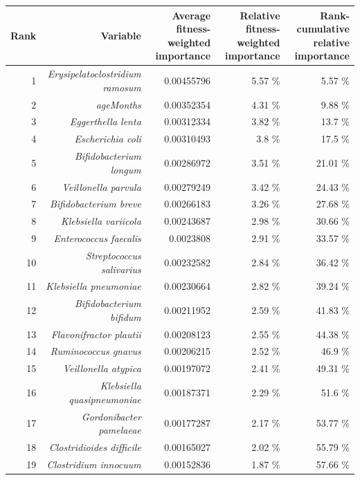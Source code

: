 \documentclass{article}
\begin{document}
\begin{table}
    \begin{tabular}{|r|r|r|r|r|}
      \hline\hline
      \textbf{Rank} & \textbf{Variable} & \textbf{Average fitness-weighted importance} & \textbf{Relative fitness-weighted importance} & \textbf{Rank-cumulative relative importance } \\\hline
      1 & \textit{Erysipelatoclostridium ramosum} & 0.00455796 & 5.57 \% & 5.57 \% \\
      2 & \textit{ageMonths} & 0.00352354 & 4.31 \% & 9.88 \% \\
      3 & \textit{Eggerthella lenta} & 0.00312334 & 3.82 \% & 13.7 \% \\
      4 & \textit{Escherichia coli} & 0.00310493 & 3.8 \% & 17.5 \% \\
      5 & \textit{Bifidobacterium longum} & 0.00286972 & 3.51 \% & 21.01 \% \\
      6 & \textit{Veillonella parvula} & 0.00279249 & 3.42 \% & 24.43 \% \\
      7 & \textit{Bifidobacterium breve} & 0.00266183 & 3.26 \% & 27.68 \% \\
      8 & \textit{Klebsiella variicola} & 0.00243687 & 2.98 \% & 30.66 \% \\
      9 & \textit{Enterococcus faecalis} & 0.0023808 & 2.91 \% & 33.57 \% \\
      10 & \textit{Streptococcus salivarius} & 0.00232582 & 2.84 \% & 36.42 \% \\
      11 & \textit{Klebsiella pneumoniae} & 0.00230664 & 2.82 \% & 39.24 \% \\
      12 & \textit{Bifidobacterium bifidum} & 0.00211952 & 2.59 \% & 41.83 \% \\
      13 & \textit{Flavonifractor plautii} & 0.00208123 & 2.55 \% & 44.38 \% \\
      14 & \textit{Ruminococcus gnavus} & 0.00206215 & 2.52 \% & 46.9 \% \\
      15 & \textit{Veillonella atypica} & 0.00197072 & 2.41 \% & 49.31 \% \\
      16 & \textit{Klebsiella quasipneumoniae} & 0.00187371 & 2.29 \% & 51.6 \% \\
      17 & \textit{Gordonibacter pamelaeae} & 0.00177287 & 2.17 \% & 53.77 \% \\
      18 & \textit{Clostridioides difficile} & 0.00165027 & 2.02 \% & 55.79 \% \\
      19 & \textit{Clostridium innocuum} & 0.00152836 & 1.87 \% & 57.66 \% \\

\end{tabular}
\end{table}
\end{document}
